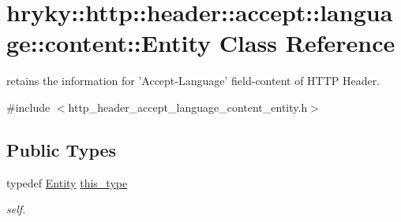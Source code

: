 \hypertarget{classhryky_1_1http_1_1header_1_1accept_1_1language_1_1content_1_1_entity}{\section{hryky\-:\-:http\-:\-:header\-:\-:accept\-:\-:language\-:\-:content\-:\-:Entity Class Reference}
\label{classhryky_1_1http_1_1header_1_1accept_1_1language_1_1content_1_1_entity}
}


retains the information for 'Accept-\/\-Language' field-\/content of H\-T\-T\-P Header.  




{\ttfamily \#include $<$http\-\_\-header\-\_\-accept\-\_\-language\-\_\-content\-\_\-entity.\-h$>$}

\subsection*{Public Types}
\begin{DoxyCompactItemize}
\item 
\hypertarget{classhryky_1_1http_1_1header_1_1accept_1_1language_1_1content_1_1_entity_a3f9665efc143864532ec26b2a2d9a63b}{typedef \hyperlink{classhryky_1_1http_1_1header_1_1accept_1_1language_1_1content_1_1_entity}{Entity} \hyperlink{classhryky_1_1http_1_1header_1_1accept_1_1language_1_1content_1_1_entity_a3f9665efc143864532ec26b2a2d9a63b}{this\-\_\-type}}\label{classhryky_1_1http_1_1header_1_1accept_1_1language_1_1content_1_1_entity_a3f9665efc143864532ec26b2a2d9a63b}

\begin{DoxyCompactList}\small\item\em self. \end{DoxyCompactList}\end{DoxyCompactItemize}
